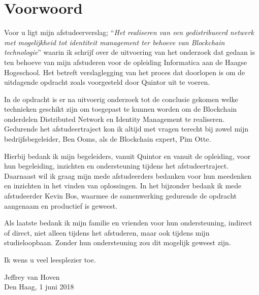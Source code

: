 \chapter*{Voorwoord}

Voor u ligt mijn afstudeerverslag; ``\textit{Het realiseren van een gedistribueerd netwerk met mogelijkheid tot identiteit management ter behoeve van Blockchain technologie}'' waarin ik schrijf over de uitvoering van het onderzoek dat gedaan is ten behoeve van mijn afstuderen voor de opleiding Informatica aan de Haagse Hogeschool. Het betreft verslaglegging van het proces dat doorlopen is om de uitdagende opdracht zoals voorgesteld door Quintor uit te voeren.

In de opdracht is er na uitvoerig onderzoek tot de conclusie gekomen welke technieken geschikt zijn om toegepast te kunnen worden om de Blockchain onderdelen Distributed Network en Identity Management te realiseren. Gedurende het afstudeertraject kon ik altijd met vragen terecht bij zowel mijn bedrijfsbegeleider, Ben Ooms, als de Blockchain expert, Pim Otte.

Hierbij bedank ik mijn begeleiders, vanuit Quintor en vanuit de opleiding, voor hun begeleiding, inzichten en ondersteuning tijdens het afstudeertraject. Daarnaast wil ik graag mijn mede afstudeerders bedanken voor hun meedenken en inzichten in het vinden van oplossingen. In het bijzonder bedank ik mede afstudeerder Kevin Bos, waarmee de samenwerking gedurende de opdracht aangenaam en productief is geweest. 

Als laatste bedank ik mijn familie en vrienden voor hun ondersteuning, indirect of direct, niet alleen tijdens het afstuderen, maar ook tijdens mijn studieloopbaan. Zonder hun ondersteuning zou dit mogelijk geweest zijn.

Ik wens u veel leesplezier toe.

\bigskip
\bigskip

Jeffrey van Hoven \\
Den Haag, 1 juni 2018
